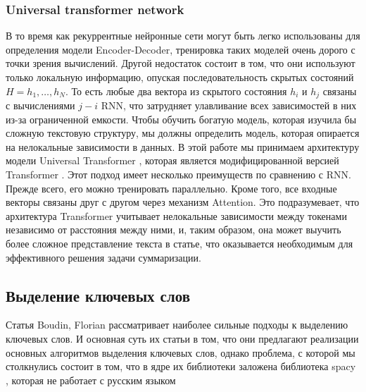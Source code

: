 \documentclass[14pt]{matmex-diploma-custom}
\begin{document}


\subsubsection{Universal transformer network}
В то время как рекуррентные нейронные сети могут быть легко использованы для определения модели Encoder-Decoder, тренировка таких моделей очень дорого с точки зрения вычислений. Другой недостаток состоит в том, что они используют только локальную информацию, опуская последовательность скрытых состояний $H = {h_1, \dots, h_N}$. То есть любые два вектора из скрытого состояния $h_i$ и $h_j$ связаны с вычислениями $j - i$ RNN, что затрудняет улавливание всех зависимостей в них из-за ограниченной емкости. Чтобы обучить богатую модель, которая изучила бы сложную текстовую структуру, мы должны определить модель, которая опирается на нелокальные зависимости в данных.
В этой работе мы принимаем архитектуру модели Universal Transformer \cite{DBLP:journals/corr/abs-1807-03819}, которая является модифицированной версией Transformer \cite{DBLP:journals/corr/VaswaniSPUJGKP17}. Этот подход имеет несколько преимуществ по сравнению с RNN. Прежде всего, его можно тренировать параллельно. Кроме того, все входные векторы связаны друг с другом через механизм Attention. Это подразумевает, что архитектура Transformer учитывает нелокальные зависимости между токенами независимо от расстояния между ними, и, таким образом, она может выучить более сложное представление текста в статье, что оказывается необходимым для эффективного решения задачи суммаризации.

\subsection{Выделение ключевых слов}

Статья Boudin, Florian \cite{boudin:2016:COLINGDEMO} рассматривает наиболее сильные подходы к выделению ключевых слов.
И основная суть их статьи в том, что они предлагают реализации основных алгоритмов выделения ключевых слов, однако проблема,
с которой мы столкнулись состоит в том, что в ядре их библиотеки заложена библиотека spacy \cite{honnibal-johnson:2015:EMNLP}, которая не работает с русским языком
\end{document}

